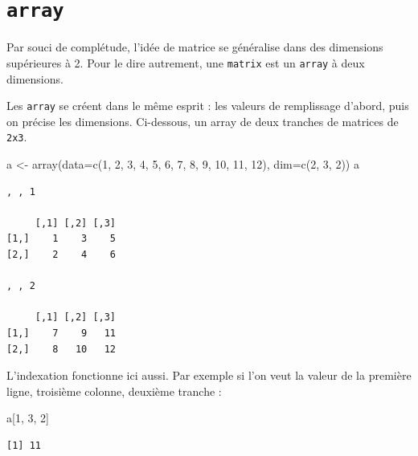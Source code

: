 \documentclass[
  letterpaper,
  DIV=11,
  numbers=noendperiod]{scrreprt}
\newenvironment{Shaded}{\begin{snugshade}}{\end{snugshade}}
\newcommand{\AttributeTok}[1]{\textcolor[rgb]{0.40,0.45,0.13}{#1}}
\newcommand{\DecValTok}[1]{\textcolor[rgb]{0.68,0.00,0.00}{#1}}
\newcommand{\FunctionTok}[1]{\textcolor[rgb]{0.28,0.35,0.67}{#1}}
\newcommand{\NormalTok}[1]{\textcolor[rgb]{0.00,0.23,0.31}{#1}}
\newcommand{\OtherTok}[1]{\textcolor[rgb]{0.00,0.23,0.31}{#1}}
\begin{document}
\hypertarget{array}{%
\section{\texorpdfstring{\texttt{array}}{array}}\label{array}}

Par souci de complétude, l'idée de matrice se généralise dans des
dimensions supérieures à 2. Pour le dire autrement, une \texttt{matrix}
est un \texttt{array} à deux dimensions.

Les \texttt{array} se créent dans le même esprit : les valeurs de
remplissage d'abord, puis on précise les dimensions. Ci-dessous, un
array de deux tranches de matrices de \texttt{2x3}.

\begin{Shaded}
\begin{Highlighting}[]
\NormalTok{a }\OtherTok{\textless{}{-}} \FunctionTok{array}\NormalTok{(}\AttributeTok{data=}\FunctionTok{c}\NormalTok{(}\DecValTok{1}\NormalTok{, }\DecValTok{2}\NormalTok{, }\DecValTok{3}\NormalTok{, }\DecValTok{4}\NormalTok{, }\DecValTok{5}\NormalTok{, }\DecValTok{6}\NormalTok{, }\DecValTok{7}\NormalTok{, }\DecValTok{8}\NormalTok{, }\DecValTok{9}\NormalTok{, }\DecValTok{10}\NormalTok{, }\DecValTok{11}\NormalTok{, }\DecValTok{12}\NormalTok{), }\AttributeTok{dim=}\FunctionTok{c}\NormalTok{(}\DecValTok{2}\NormalTok{, }\DecValTok{3}\NormalTok{, }\DecValTok{2}\NormalTok{))}
\NormalTok{a}
\end{Highlighting}
\end{Shaded}

\begin{verbatim}
, , 1

     [,1] [,2] [,3]
[1,]    1    3    5
[2,]    2    4    6

, , 2

     [,1] [,2] [,3]
[1,]    7    9   11
[2,]    8   10   12
\end{verbatim}

L'indexation fonctionne ici aussi. Par exemple si l'on veut la valeur de
la première ligne, troisième colonne, deuxième tranche :

\begin{Shaded}
\begin{Highlighting}[]
\NormalTok{a[}\DecValTok{1}\NormalTok{, }\DecValTok{3}\NormalTok{, }\DecValTok{2}\NormalTok{]}
\end{Highlighting}
\end{Shaded}

\begin{verbatim}
[1] 11
\end{verbatim}
\end{document}
